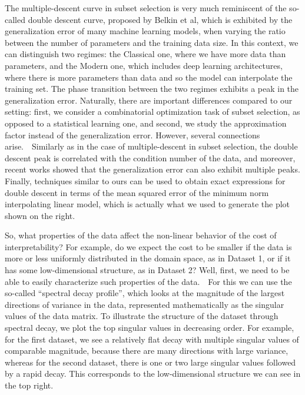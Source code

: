 \documentclass[11pt]{article}
\def\b{{~\textbullet~}}
\begin{document}
The multiple-descent curve in subset selection is very much
reminiscent of the so-called double descent curve, proposed by Belkin
et al, which is exhibited by the generalization error of many machine
learning models, when varying the ratio between the number of
parameters and the training data size. In this context, we can
distinguish two regimes: the Classical one, where we have more data
than parameters, and the Modern one, which includes deep learning
architectures, where there is more parameters than data and so the
model can interpolate the training set. The phase transition between
the two regimes exhibits a peak in the generalization
error. Naturally, there are important differences compared to our
setting: first, we consider a combinatorial optimization task of
subset selection, as opposed to a statistical learning one, and
second, we study the approximation factor instead of the
generalization error. However, several connections arise.\b Similarly as
in the case of multiple-descent in subset selection, the double
descent peak is correlated with the condition number of the data, and
moreover, recent works showed that the generalization error can also
exhibit multiple peaks. Finally, techniques similar to ours can be
used to obtain exact expressions for double descent in terms of the
mean squared error of the minimum norm interpolating linear model,
which is actually what we used to generate the plot shown on the
right. 

So, what properties of the data affect the non-linear behavior of the
cost of interpretability? For example, 
do we expect the cost to be smaller if the data
is more or less uniformly distributed in the domain space, as in
Dataset 1, or if it has some low-dimensional structure, as in Dataset 2?
Well, first, we need to be able to easily characterize such properties of the data.\b For
this we can use the so-called ``spectral decay profile'', which looks at
the magnitude of the largest directions of variance in the data, represented
mathematically as the singular
values of the data matrix. To illustrate the structure of the dataset through spectral decay, we plot
the top singular values in decreasing order. For example, for the first dataset, we see a relatively
flat decay with multiple singular values of comparable
magnitude, because there are many directions with large
variance, whereas for the second dataset, there is one or two large singular values
followed by a rapid decay. This corresponds to the
low-dimensional structure we can see in the top right.
\end{document}
